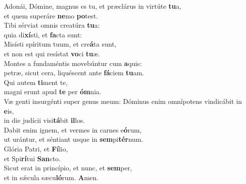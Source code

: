 \evenverse Adonái, Dómine, magnus es tu, et præclárus in virtúte \textbf{tu}a,~\*\\
\evenverse et quem superáre \textbf{ne}mo \textbf{po}test.\\
\oddverse Tibi sérviat omnis creatúra \textbf{tu}a:~\*\\
\oddverse quia di\textbf{xí}sti, et \textbf{fa}cta sunt:\\
\evenverse Misísti spíritum tuum, et cre\textbf{á}ta sunt,~\*\\
\evenverse et non est qui resístat \textbf{vo}ci \textbf{tu}æ.\\
\oddverse Montes a fundaméntis movebúntur cum \textbf{a}quis:~\*\\
\oddverse petræ, sicut cera, liquéscent ante \textbf{fá}ciem \textbf{tu}am.\\
\evenverse Qui autem \textbf{ti}ment te,~\*\\
\evenverse magni erunt apud \textbf{te} per \textbf{óm}nia.\\
\oddverse Væ genti insurgénti super genus meum: Dóminus enim omnípotens vindicábit in \textbf{e}is,~\*\\
\oddverse in die judícii visi\textbf{tá}bit \textbf{il}los.\\
\evenverse Dabit enim ignem, et vermes in carnes e\textbf{ó}rum,~\*\\
\evenverse ut urántur, et séntiant usque in \textbf{sem}pi\textbf{tér}num.\\
\oddverse Glória Patri, et \textbf{Fí}lio,~\*\\
\oddverse et Spi\textbf{rí}tui \textbf{San}cto.\\
\evenverse Sicut erat in princípio, et nunc, et \textbf{sem}per,~\*\\
\evenverse et in sǽcula sæcu\textbf{ló}rum. \textbf{A}men.\\
